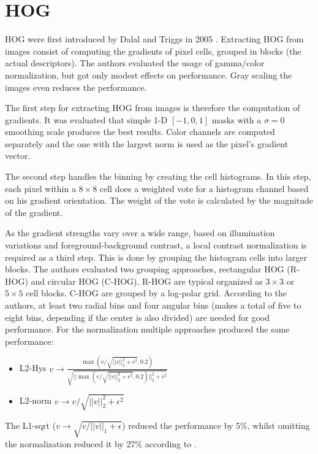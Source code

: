 \section{\acf{HOG}}
\label{sec:hog}

\acs{HOG} were first introduced by Dalal and Triggs in 2005 \cite{Dalal2005}. Extracting \acs{HOG} from images consist of computing the gradients of pixel cells, grouped in blocks (the actual descriptors). The authors evaluated the usage of gamma/color normalization, but got only modest effects on performance. Gray scaling the images even reduces the performance.

The first step for extracting \ac{HOG} from images is therefore the computation of gradients. It was evaluated that simple 1-D $[-1, 0, 1]$ masks with a $\sigma = 0$ smoothing scale produces the best results. Color channels are computed separately and the one with the largest norm is used as the pixel's gradient vector.

The second step handles the binning by creating the cell histograms. In this step, each pixel within a $8 \times 8$ cell does a weighted vote for a histogram channel based on his gradient orientation. The weight of the vote is calculated by the magnitude of the gradient.

As the gradient strengths vary over a wide range, based on illumination variations and foreground-background contrast, a local contrast normalization is required as a third step. This is done by grouping the histogram cells into larger blocks. The authors evaluated two grouping approaches, rectangular HOG (\acs{R-HOG}) and circular HOG (\acs{C-HOG}). \acs{R-HOG} are typical organized as $3\times3$ or $5\times5$ cell blocks. \acs{C-HOG} are grouped by a log-polar grid. According to the authors, at least two radial bins and four angular bins (makes a total of five to eight bins, depending if the center is also divided) are needed for good performance.
For the normalization multiple approaches produced the same performance:
\begin{itemize}
	\item L2-Hys $v \rightarrow \frac{\max(v / \sqrt{||v||_2^2 + \epsilon^2}, 0.2)}{\sqrt{||\max(v / \sqrt{||v||_2^2 + \epsilon^2}, 0.2)||_2^2 + \epsilon^2}}$ %
	\item L2-norm $v \rightarrow v / \sqrt{||v||_2^2 + \epsilon^2}$
\end{itemize}
The L1-sqrt ($v \rightarrow \sqrt{v / ||v||_1 + \epsilon}$) reduced the performance by 5\%, whilst omitting the normalization reduced it by 27\% according to \cite{Dalal2005}.